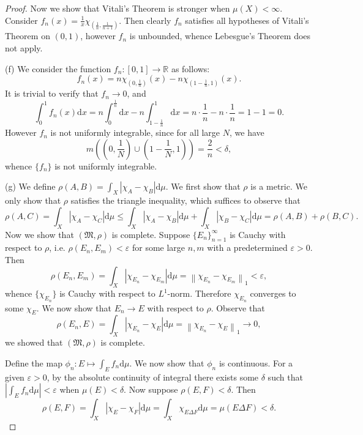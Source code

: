 \begin{proof}
Now we show that Vitali's Theorem is stronger when $\mu(X)<\infty$. Consider $f_n(x)=\frac{1}{x}\chi_{\left(\frac{1}{n},\frac{1}{n+1}\right)}$. Then clearly $f_n$ satisfies all hypotheses of Vitali's Theorem on $(0,1)$, however $f_n$ is unbounded, whence Lebesgue's Theorem does not apply.\par
(f) We consider the function $f_n:[0,1]\to\mathbb{R}$ as follows: 
$$
f_n\left( x \right) =n\chi _{\left( 0,\frac{1}{n} \right)}\left( x \right) -n\chi _{\left( 1-\frac{1}{n},1 \right)}\left( x \right) .
$$
It is trivial to verify that $f_n\to 0$, and 
$$
\int_0^1{f_n\left( x \right) \mathrm{d}x}=n\int_0^{\frac{1}{n}}{\mathrm{d}x}-n\int_{1-\frac{1}{n}}^1{\mathrm{d}x}=n\cdot \frac{1}{n}-n\cdot \frac{1}{n}=1-1=0.
$$
However $f_n$ is not uniformly integrable, since for all large $N$, we have 
$$
m\left( \left( 0,\frac{1}{N} \right) \cup \left( 1-\frac{1}{N},1 \right) \right) =\frac{2}{n}<\delta ,
$$
whence $\{f_n\}$ is not uniformly integrable.\par
(g) We define $\rho(A,B)=\int_X|\chi_A-\chi_B|\mathrm{d}\mu$. We first show that $\rho$ is a metric. We only show that $\rho$ satisfies the triangle inequality, which suffices to observe that 
$$
\rho \left( A,C \right) =\int_X{\left| \chi _A-\chi _C \right|\mathrm{d}\mu}\le \int_X{\left| \chi _A-\chi _B \right|\mathrm{d}\mu}+\int_X{\left| \chi _B-\chi _C \right|\mathrm{d}\mu}=\rho \left( A,B \right) +\rho \left( B,C \right) .
$$
Now we show that $(\mathfrak{M},\rho)$ is complete. Suppose $\{E_n\}_{n=1}^\infty$ is Cauchy with respect to $\rho$, i.e. $\rho(E_n,E_m)<\varepsilon$ for some large $n,m$ with a predetermined $\varepsilon>0$. Then 
$$
\rho \left( E_n,E_m \right) =\int_X{\left| \chi _{E_n}-\chi _{E_m} \right|\mathrm{d}\mu}=\left\| \chi _{E_n}-\chi _{E_m} \right\| _1<\varepsilon ,
$$
whence $\{\chi_{E_n}\}$ is Cauchy with respect to $L^1$-norm. Therefore $\chi_{E_n}$ converges to some $\chi_E$. We now show that $E_n\to E$ with respect to $\rho$. Observe that 
$$
\rho \left( E_n,E \right) =\int_X{\left| \chi _{E_n}-\chi _E \right|\mathrm{d}\mu}=\left\| \chi _{E_n}-\chi _E \right\| _1\rightarrow 0,
$$
we showed that $(\mathfrak{M},\rho)$ is complete.\par
Define the map $\phi_n:E\mapsto\int_Ef_n\mathrm{d}\mu$. We now show that $\phi_n$ is continuous. For a given $\varepsilon>0$, by the absolute continuity of integral there exists some $\delta$ such that $|\int_Ef_n\mathrm{d}\mu|<\varepsilon$ when $\mu(E)<\delta$. Now suppose $\rho(E,F)<\delta$. Then 
$$
\rho \left( E,F \right) =\int_X{\left| \chi _E-\chi _F \right|\mathrm{d}\mu}=\int_X{\chi _{E\Delta F}\mathrm{d}\mu}=\mu \left( E\Delta F \right) <\delta .
$$
\end{proof}
